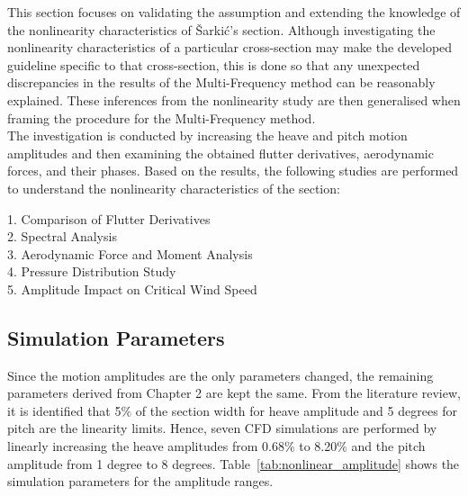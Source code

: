 \documentclass[../main]{subfiles}
\begin{document}
This section focuses on validating the assumption and extending the knowledge of the nonlinearity characteristics 
of \v{S}arki\'c's section. Although investigating the nonlinearity characteristics of a particular cross-section may make 
the developed guideline specific to that cross-section, this is done so that any unexpected discrepancies 
in the results of the Multi-Frequency method can be reasonably explained. These inferences from the nonlinearity study are then generalised 
when framing the procedure for the Multi-Frequency method. \\

The investigation is conducted by increasing the heave and pitch motion amplitudes and then examining the obtained 
flutter derivatives, aerodynamic forces, and their phases. Based on the results, the following studies are performed 
to understand the nonlinearity characteristics of the section:

\begin{flushleft}
\hspace{2cm}1. Comparison of Flutter Derivatives \\
\hspace{2cm}2. Spectral Analysis \\
\hspace{2cm}3. Aerodynamic Force and Moment Analysis \\
\hspace{2cm}4. Pressure Distribution Study \\
\hspace{2cm}5. Amplitude Impact on Critical Wind Speed \\
\end{flushleft}

\subsection{Simulation Parameters}

Since the motion amplitudes are the only parameters changed, the remaining parameters derived from Chapter 2 are kept the same. 
From the literature review, it is identified that 5$\%$ of the section width for heave amplitude and 5 degrees for pitch are 
the linearity limits. Hence, seven CFD simulations are performed by linearly increasing the heave 
amplitudes from 0.68$\%$ to 8.20$\%$ and the pitch amplitude from 1 degree to 8 degrees. 
Table~\ref{tab:nonlinear_amplitude} shows the simulation parameters for the amplitude ranges. \\
\end{document}
